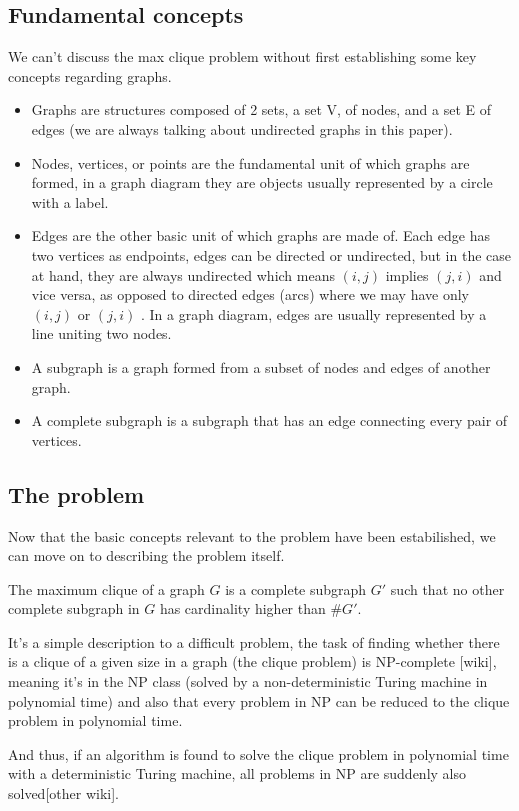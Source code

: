 \documentclass[...]{revdetua}
\begin{document}
\subsection{Fundamental concepts}
We can’t discuss the max clique problem without first establishing some key concepts regarding graphs.
\begin{itemize}
\item Graphs are structures composed of 2 sets, a set V, of nodes, and a set E of edges (we are always talking about undirected graphs in this paper).
\item Nodes, vertices, or points are the fundamental unit of which graphs are formed, in a graph diagram they are objects usually represented by a circle with a label.
\item Edges are the other basic unit of which graphs are made of. Each edge has two vertices as endpoints, edges can be directed or undirected, but in the case at hand, they are always undirected which means $(i,j)$ implies $(j,i)$ and vice versa, as opposed to directed edges (arcs) where we may have only $(i,j)$ or $(j,i)$ . In a graph diagram, edges are usually represented by a line uniting two nodes.
\item A subgraph is a graph formed from a subset of nodes and edges of another graph.
\item A complete subgraph is a subgraph that has an edge connecting every pair of vertices.
\end{itemize}
\subsection{The problem}
Now that the basic concepts relevant to the problem have been estabilished, we can move on to describing the problem itself.\par
The maximum clique of a graph $G$ is a complete subgraph $G'$ such that no other complete subgraph in $G$ has cardinality higher than $\#G'$.\par
It's a simple description to a difficult problem, the task of finding whether there is a clique of a given size in a graph (the clique problem) is NP-complete [wiki], meaning it's in the NP class (solved by a non-deterministic Turing machine in polynomial time) and also that every problem in NP can be reduced to the clique problem in polynomial time.\par 
And thus, if an algorithm is found to solve the clique problem in polynomial time with a deterministic Turing machine, all problems in NP are suddenly also solved[other wiki]. 
\end{document}
